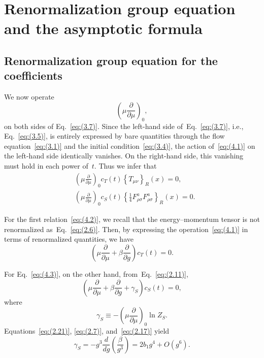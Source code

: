 \section{Renormalization group equation and the asymptotic formula}
\label{sec:4}
\subsection{Renormalization group equation for the coefficients}
\label{sec:4.1}
We now operate
\begin{equation}
   \left(\mu\frac{\partial}{\partial\mu}\right)_0,
\label{eq:(4.1)}
\end{equation}
on both sides of Eq.~\eqref{eq:(3.7)}. Since the left-hand side
of~Eq.~\eqref{eq:(3.7)}, i.e., Eq.~\eqref{eq:(3.5)}, is entirely expressed by
bare quantities through the flow equation~\eqref{eq:(3.1)} and the initial
condition~\eqref{eq:(3.4)}, the action of~\eqref{eq:(4.1)} on the left-hand
side identically vanishes. On the right-hand side, this vanishing must hold in
each power of~$t$. Thus we infer that
\begin{align}
   &\left(\mu\frac{\partial}{\partial\mu}\right)_0c_T(t)
   \left\{T_{\mu\nu}\right\}_R(x)=0,
\label{eq:(4.2)}
\\
   &\left(\mu\frac{\partial}{\partial\mu}\right)_0c_S(t)
   \left\{\frac{1}{4}F_{\rho\sigma}^aF_{\rho\sigma}^a\right\}_R(x)=0.
\label{eq:(4.3)}
\end{align}

For the first relation~\eqref{eq:(4.2)}, we recall that the energy--momentum
tensor is not renormalized as~Eq.~\eqref{eq:(2.6)}. Then, by expressing the
operation~\eqref{eq:(4.1)} in terms of renormalized quantities, we have
\begin{equation}
   \left(\mu\frac{\partial}{\partial\mu}
   +\beta\frac{\partial}{\partial g}\right)c_T(t)=0.
\label{eq:(4.4)}
\end{equation}

For Eq.~\eqref{eq:(4.3)}, on the other hand, from~Eq.~\eqref{eq:(2.11)},
\begin{equation}
   \left(\mu\frac{\partial}{\partial\mu}
   +\beta\frac{\partial}{\partial g}
   +\gamma_S\right)c_S(t)=0,
\label{eq:(4.5)}
\end{equation}
where
\begin{equation}
   \gamma_S
   \equiv-\left(\mu\frac{\partial}{\partial\mu}\right)_0\ln Z_S.
\label{eq:(4.6)}
\end{equation}
Equations~\eqref{eq:(2.21)}, \eqref{eq:(2.7)}, and~\eqref{eq:(2.17)} yield
\begin{equation}
   \gamma_S=-g^3\frac{d}{dg}\left(\frac{\beta}{g^3}\right)
   =2b_1g^4+O(g^6).
\label{eq:(4.7)}
\end{equation}


